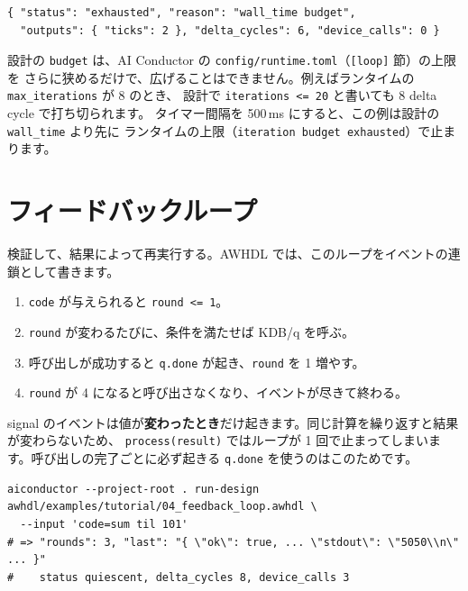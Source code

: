 \documentclass[a4paper,11pt]{ltjsarticle}
\newcommand{\ex}[1]{\texttt{examples/tutorial/#1}}
\begin{document}
\begin{lstlisting}[style=shell,caption={実行結果（デバイスなし、約 3 秒）}]
{ "status": "exhausted", "reason": "wall_time budget",
  "outputs": { "ticks": 2 }, "delta_cycles": 6, "device_calls": 0 }
\end{lstlisting}

\begin{caution}[設計の予算とランタイムの予算]
設計の \texttt{budget} は、AI Conductor の \texttt{config/runtime.toml}（\texttt{[loop]} 節）の上限を
さらに狭めるだけで、広げることはできません。例えばランタイムの \texttt{max\_iterations} が 8 のとき、
設計で \texttt{iterations <= 20} と書いても 8 delta cycle で打ち切られます。
タイマー間隔を 500\,ms にすると、この例は設計の \texttt{wall\_time} より先に
ランタイムの上限（\texttt{iteration budget exhausted}）で止まります。
\end{caution}

\section{フィードバックループ}

検証して、結果によって再実行する。AWHDL では、このループをイベントの連鎖として書きます。



\begin{enumerate}
  \item \texttt{code} が与えられると \texttt{round <= 1}。
  \item \texttt{round} が変わるたびに、条件を満たせば KDB/q を呼ぶ。
  \item 呼び出しが成功すると \texttt{q.done} が起き、\texttt{round} を 1 増やす。
  \item \texttt{round} が 4 になると呼び出さなくなり、イベントが尽きて終わる。
\end{enumerate}

\begin{caution}
signal のイベントは値が\textbf{変わったとき}だけ起きます。同じ計算を繰り返すと結果が変わらないため、
\texttt{process(result)} ではループが 1 回で止まってしまいます。呼び出しの完了ごとに必ず起きる
\texttt{q.done} を使うのはこのためです。
\end{caution}

\begin{lstlisting}[style=shell]
aiconductor --project-root . run-design awhdl/examples/tutorial/04_feedback_loop.awhdl \
  --input 'code=sum til 101'
# => "rounds": 3, "last": "{ \"ok\": true, ... \"stdout\": \"5050\\n\" ... }"
#    status quiescent, delta_cycles 8, device_calls 3
\end{lstlisting}
\end{document}
